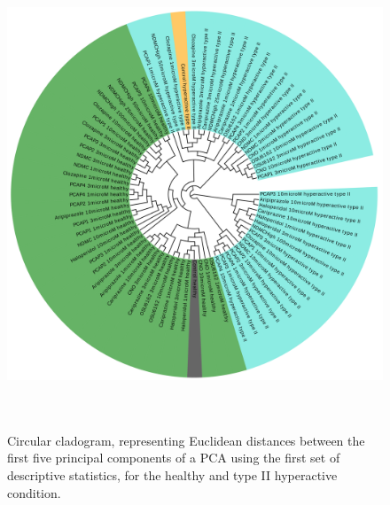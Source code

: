 \documentclass[a4paper,12pt]{article}
\begin{document}
\begin{figure}[h!]
\begin{center}
\includegraphics[width=14cm,height=14cm]{DarkPTZ_set1_PCA_tree_A.png}
\caption{Circular cladogram, representing Euclidean distances between the first five principal components of a PCA using the first set of descriptive statistics, for the healthy and type II hyperactive condition.}
\end{center}
\end{figure}
\end{document}
